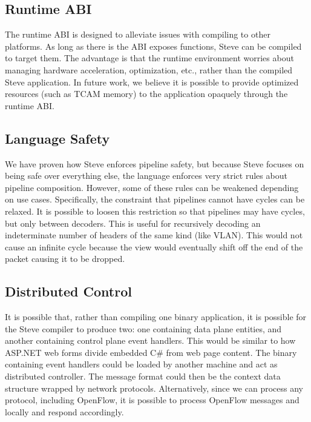 \subsection{Runtime ABI}

The runtime ABI is designed to alleviate issues with compiling to other platforms.
As long as there is the ABI exposes functions, Steve can be compiled to target them. The advantage is that the runtime environment worries about managing hardware acceleration, optimization, etc., rather than the compiled Steve application. In future work, we believe it is possible to provide optimized resources (such as TCAM memory) to the application opaquely through the runtime ABI.

\subsection{Language Safety}

We have proven how Steve enforces pipeline safety, but
because Steve focuses on being safe over everything else, the language enforces very strict rules about pipeline composition. However, some of these rules can be weakened depending on use cases.
Specifically, the constraint that pipelines cannot have cycles can be relaxed. It is possible to loosen this restriction so that pipelines may have cycles, but only between decoders. This is useful for recursively decoding an indeterminate number of headers of the same kind (like VLAN). This would not cause an infinite cycle because the view would eventually shift off the end of the packet causing it to be dropped.

\subsection{Distributed Control}

It is possible that, rather than compiling one binary application, it is possible for the Steve compiler to produce two: one containing data plane entities, and another containing control plane event handlers. This would be similar to how ASP.NET web forms divide embedded C\# from web page content. The binary containing event handlers could be loaded by another machine and act as distributed controller. The message format could then be the context data structure wrapped by network protocols. Alternatively, since we can process any protocol, including OpenFlow, it is possible to process OpenFlow messages and locally and respond accordingly.

